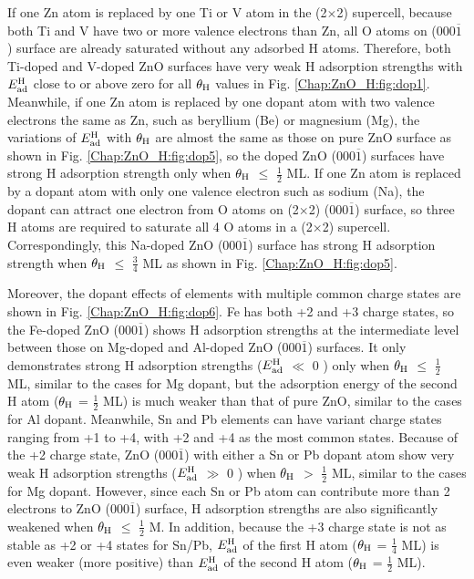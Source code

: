 If one Zn atom is replaced by one Ti or V atom in the (2$\times$2) supercell, because both Ti and V have two or more valence electrons than Zn, all O atoms on (000$\overline{1}$) surface are already saturated without any adsorbed H atoms. Therefore,  both Ti-doped and V-doped ZnO surfaces have very weak H adsorption strengths with $E_{\textup{ad}}^{\textup{H}}$ close to or above zero for all $\theta_{\textup{H}}$ values in Fig. \ref{Chap:ZnO_H:fig:dop1}. Meanwhile, if one Zn atom is replaced by one dopant atom with two valence electrons the same as Zn, such as beryllium (Be) or magnesium (Mg), the variations of $E_{\textup{ad}}^{\textup{H}}$ with $\theta_{\textup{H}}$ are almost the same as those on pure ZnO surface as shown in Fig. \ref{Chap:ZnO_H:fig:dop5}, so the doped ZnO (000$\overline{1}$) surfaces have strong H adsorption strength only when $\theta_{\textup{H}}$ $\leq$ $\frac{1}{2}$ ML. If one Zn atom is replaced by a dopant atom with only one valence electron such as sodium (Na), the dopant can attract one electron from O atoms on (2$\times$2)  (000$\overline{1}$) surface, so three H atoms are required to saturate all 4 O atoms in a (2$\times$2) supercell. Correspondingly, this Na-doped ZnO (000$\overline{1}$) surface has strong H adsorption strength when $\theta_{\textup{H}}$ $\leq$ $\frac{3}{4}$ ML  as shown in Fig. \ref{Chap:ZnO_H:fig:dop5}. 

Moreover, the dopant effects of elements with multiple common charge states are shown in Fig. \ref{Chap:ZnO_H:fig:dop6}. Fe has both +2 and +3 charge states, so the Fe-doped ZnO (000$\overline{1}$) shows H adsorption strengths at the intermediate level between those on Mg-doped and Al-doped ZnO (000$\overline{1}$) surfaces. It only demonstrates strong H adsorption strengths ($E_{\textup{ad}}^{\textup{H}}$ $\ll$ 0 ) only when $\theta_{\textup{H}}$ $\leq$ $\frac{1}{2}$ ML, similar to the cases for Mg dopant, but the adsorption energy of the second H atom ($\theta_{\textup{H}}$ = $\frac{1}{2}$ ML) is much weaker than that of pure ZnO,  similar to the cases for Al dopant. Meanwhile, Sn and Pb elements can have variant charge states ranging from +1 to +4, with +2 and +4 as the most common states\cite{Greenwood97}. Because of the +2 charge state, ZnO (000$\overline{1}$) with either a Sn or Pb dopant atom show very weak H adsorption strengths ($E_{\textup{ad}}^{\textup{H}}$ $\gg$ 0 ) when $\theta_{\textup{H}}$ $>$ $\frac{1}{2}$ ML, similar to the cases for Mg dopant.  However, since each Sn or Pb atom can contribute more than 2 electrons to ZnO (000$\overline{1}$) surface, H adsorption strengths are also significantly weakened when $\theta_{\textup{H}}$ $\leq$ $\frac{1}{2}$ M. In addition, because the +3 charge state is not as stable as +2 or +4 states for Sn/Pb\cite{Greenwood97}, $E_{\textup{ad}}^{\textup{H}}$ of the first H atom ($\theta_{\textup{H}}$ = $\frac{1}{4}$ ML) is even weaker (more positive) than $E_{\textup{ad}}^{\textup{H}}$ of the second H atom ($\theta_{\textup{H}}$ = $\frac{1}{2}$ ML).

